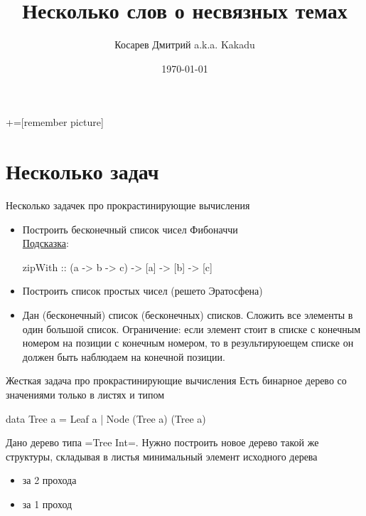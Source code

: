 \documentclass[
  xcolor={svgnames},
  hyperref={colorlinks,citecolor=DeepPink4,linkcolor=DarkRed,urlcolor=DarkBlue}]{beamer}
\title[Занятие 3]{Несколько слов о несвязных темах}
\author{Косарев Дмитрий a.k.a. Kakadu}
\institute{матмех СПбГУ}
\date{\today}
\begin{document}
\maketitle

+=[remember picture]

\everymath{\displaystyle}


\section{Несколько задач}

\begin{frame}[fragile]{Несколько задачек про прокрастинирующие вычисления}
\begin{itemize}
 \item Построить бесконечный список чисел Фибоначчи \\ \href{https://www.haskell.org/hoogle/?hoogle=zipWith}{Подсказка}:\vspace{0.5cm}
 \begin{verbnobox}[\monacoB]
zipWith :: (a -> b -> c) -> [a] -> [b] -> [c]
 \end{verbnobox}
 \item Построить список простых чисел (решето Эратосфена)
 \item Дан (бесконечный) список (бесконечных) списков. Сложить все элементы в один большой список. Ограничение: если элемент стоит в списке с конечным номером на позиции с конечным номером, то в результируюещем списке он должен быть наблюдаем на конечной позиции.
\end{itemize}

\end{frame}

\begin{frame}[fragile]{Жесткая задача про прокрастинирующие вычисления}
Есть бинарное дерево со значениями только в листях и типом \pause
\begin{verbnobox}[\monacoB] 
data Tree a = Leaf a
            | Node (Tree a) (Tree a)
\end{verbnobox}
Дано дерево типа \hsinline=Tree Int=. Нужно построить новое дерево такой же структуры, складывая в листья минимальный элемент исходного дерева
\begin{itemize}
 \item за 2 прохода
 \item за 1 проход
\end{itemize}
\end{frame}
\end{document}
